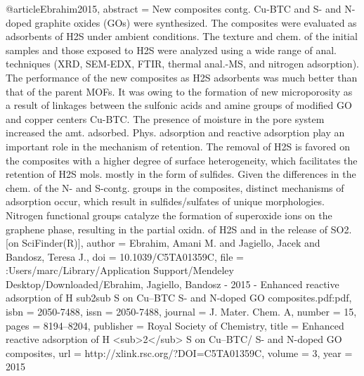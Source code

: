 @article{Ebrahim2015,
abstract = {New composites contg. Cu-BTC and S- and N-doped graphite oxides (GOs) were synthesized.  The composites were evaluated as adsorbents of H2S under ambient conditions.  The texture and chem. of the initial samples and those exposed to H2S were analyzed using a wide range of anal. techniques (XRD, SEM-EDX, FTIR, thermal anal.-MS, and nitrogen adsorption).  The performance of the new composites as H2S adsorbents was much better than that of the parent MOFs.  It was owing to the formation of new microporosity as a result of linkages between the sulfonic acids and amine groups of modified GO and copper centers Cu-BTC.  The presence of moisture in the pore system increased the amt. adsorbed.  Phys. adsorption and reactive adsorption play an important role in the mechanism of retention.  The removal of H2S is favored on the composites with a higher degree of surface heterogeneity, which facilitates the retention of H2S mols. mostly in the form of sulfides.  Given the differences in the chem. of the N- and S-contg. groups in the composites, distinct mechanisms of adsorption occur, which result in sulfides/sulfates of unique morphologies.  Nitrogen functional groups catalyze the formation of superoxide ions on the graphene phase, resulting in the partial oxidn. of H2S and in the release of SO2. [on SciFinder(R)]},
author = {Ebrahim, Amani M. and Jagiello, Jacek and Bandosz, Teresa J.},
doi = {10.1039/C5TA01359C},
file = {:Users/marc/Library/Application Support/Mendeley Desktop/Downloaded/Ebrahim, Jagiello, Bandosz - 2015 - Enhanced reactive adsorption of H sub2sub S on Cu–BTC S- and N-doped GO composites.pdf:pdf},
isbn = {2050-7488},
issn = {2050-7488},
journal = {J. Mater. Chem. A},
number = {15},
pages = {8194--8204},
publisher = {Royal Society of Chemistry},
title = {{Enhanced reactive adsorption of H {\textless}sub{\textgreater}2{\textless}/sub{\textgreater} S on Cu–BTC/ S- and N-doped GO composites}},
url = {http://xlink.rsc.org/?DOI=C5TA01359C},
volume = {3},
year = {2015}
}
